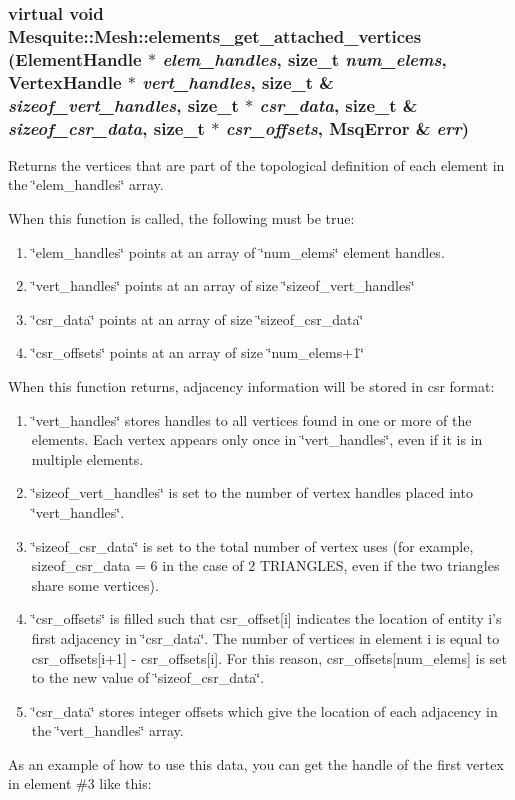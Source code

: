 \documentclass[letter]{report}
\begin{document}
\subsubsection{\setlength{\rightskip}{0pt plus 5cm}virtual void Mesquite::Mesh::elements\_\-get\_\-attached\_\-vertices (Element\-Handle $\ast$ {\em elem\_\-handles}, size\_\-t {\em num\_\-elems}, Vertex\-Handle $\ast$ {\em vert\_\-handles}, size\_\-t \& {\em sizeof\_\-vert\_\-handles}, size\_\-t $\ast$ {\em csr\_\-data}, size\_\-t \& {\em sizeof\_\-csr\_\-data}, size\_\-t $\ast$ {\em csr\_\-offsets}, {\bf Msq\-Error} \& {\em err})\hspace{0.3cm}{\tt  [pure virtual]}}\label{classMesquite_1_1Mesh_a18}


Returns the vertices that are part of the topological definition of each element in the \char`\"{}elem\_\-handles\char`\"{} array.

When this function is called, the following must be true:\begin{enumerate}
\item 
\char`\"{}elem\_\-handles\char`\"{} points at an array of \char`\"{}num\_\-elems\char`\"{} element handles.\item 
\char`\"{}vert\_\-handles\char`\"{} points at an array of size \char`\"{}sizeof\_\-vert\_\-handles\char`\"{}\item 
\char`\"{}csr\_\-data\char`\"{} points at an array of size \char`\"{}sizeof\_\-csr\_\-data\char`\"{}\item 
\char`\"{}csr\_\-offsets\char`\"{} points at an array of size \char`\"{}num\_\-elems+1\char`\"{}\end{enumerate}
When this function returns, adjacency information will be stored in csr format:\begin{enumerate}
\item 
\char`\"{}vert\_\-handles\char`\"{} stores handles to all vertices found in one or more of the elements. Each vertex appears only once in \char`\"{}vert\_\-handles\char`\"{}, even if it is in multiple elements.\item 
\char`\"{}sizeof\_\-vert\_\-handles\char`\"{} is set to the number of vertex handles placed into \char`\"{}vert\_\-handles\char`\"{}.\item 
\char`\"{}sizeof\_\-csr\_\-data\char`\"{} is set to the total number of vertex uses (for example, sizeof\_\-csr\_\-data = 6 in the case of 2 TRIANGLES, even if the two triangles share some vertices).\item 
\char`\"{}csr\_\-offsets\char`\"{} is filled such that csr\_\-offset[i] indicates the location of entity i's first adjacency in \char`\"{}csr\_\-data\char`\"{}. The number of vertices in element i is equal to csr\_\-offsets[i+1] - csr\_\-offsets[i]. For this reason, csr\_\-offsets[num\_\-elems] is set to the new value of \char`\"{}sizeof\_\-csr\_\-data\char`\"{}.\item 
\char`\"{}csr\_\-data\char`\"{} stores integer offsets which give the location of each adjacency in the \char`\"{}vert\_\-handles\char`\"{} array.\end{enumerate}
As an example of how to use this data, you can get the handle of the first vertex in element \#3 like this: 
\end{document}
